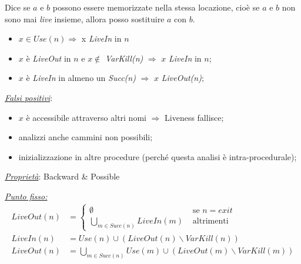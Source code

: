 \documentclass{article}
\begin{document}
                \noindent
                Dice se $a$ e $b$ possono essere memorizzate nella stessa locazione, cioè se $a$ e $b$ non sono mai \textit{live} insieme, allora posso sostituire $a$ con $b$.

                \begin{itemize}
                    \item $x\in Use(n) \Rightarrow$ x \textit{LiveIn} in $n$
                    \item $x$ è \textit{LiveOut} in $n$ e $x\notin$ \textit{VarKill(n)} $\Rightarrow$ $x$ \textit{LiveIn} in $n$;
                    \item $x$ è \textit{LiveIn} in almeno un \textit{Succ(n)} $\Rightarrow$ $x$ \textit{LiveOut(n)};
                \end{itemize}

                \noindent
                \textit{\underline{Falsi positivi}}:
                \begin{itemize}
                    \item $x$ è accessibile attraverso altri nomi $\Rightarrow$ Liveness fallisce;
                    \item analizzi anche cammini non possibili;
                    \item inizializzazione in altre procedure (perché questa analisi è intra-procedurale);
                \end{itemize}

                \noindent
                \textit{\underline{Proprietà}}: Backward \& Possible
                \newline

                \noindent
                \underline{\textit{Punto fisso:}}
                \begin{align*}
                    LiveOut(n) &=
                    \begin{cases}
                        \emptyset &\text{ se $n= exit$} \\
                        \bigcup_{m\in Succ(n)} LiveIn(m) &\text{ altrimenti}
                    \end{cases}\\
                    LiveIn(n) &= Use(n) \cup (LiveOut(n)\backslash VarKill(n))\\
                    LiveOut(n) &= \bigcup_{m\in Succ(n)} Use(m) \cup (LiveOut(m)\backslash VarKill(m))
                \end{align*}
\end{document}
